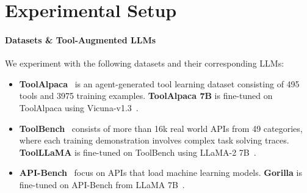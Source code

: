 \section{Experimental Setup} \label{sec:experiment}

\paragraph{Datasets \& Tool-Augmented LLMs}
We experiment with the following datasets and their corresponding LLMs:  
\vspace{-7pt}
\begin{itemize}
\itemsep-1pt
\item \textbf{ToolAlpaca}~\citep{tang2023toolalpaca} is an agent-generated tool learning dataset consisting of 495 tools and 3975 training examples. \textbf{ToolAlpaca 7B} is fine-tuned on ToolAlpaca using Vicuna-v1.3~\citep{zheng2023judging}.
\item \textbf{ToolBench}~\citep{qin2024toolllm} consists of more than 16k real world APIs from 49 categories, where each training demonstration involves complex task solving traces. \textbf{ToolLLaMA} is fine-tuned on ToolBench using LLaMA-2 7B~\citep{touvron2023llama2}.
\item \textbf{API-Bench}~\citep{patil2023gorilla} focus on APIs that load machine learning models. \textbf{Gorilla} is fine-tuned on API-Bench from LLaMA 7B~\citep{touvron2023llama1}.
\end{itemize}



